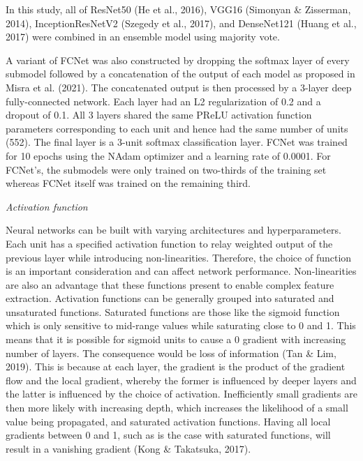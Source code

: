 \documentclass[
]{article}
\begin{document}
In this study, all of ResNet50 (He et al., 2016), VGG16 (Simonyan \&
Zisserman, 2014), InceptionResNetV2 (Szegedy et al., 2017), and
DenseNet121 (Huang et al., 2017) were combined in an ensemble model
using majority vote.

A variant of FCNet was also constructed by dropping the softmax layer of
every submodel followed by a concatenation of the output of each model
as proposed in Misra et al. (2021). The concatenated output is then
processed by a 3-layer deep fully-connected network. Each layer had an
L2 regularization of 0.2 and a dropout of 0.1. All 3 layers shared the
same PReLU activation function parameters corresponding to each unit and
hence had the same number of units (552). The final layer is a 3-unit
softmax classification layer. FCNet was trained for 10 epochs using the
NAdam optimizer and a learning rate of 0.0001. For FCNet's, the
submodels were only trained on two-thirds of the training set whereas
FCNet itself was trained on the remaining third.

\emph{Activation function}

Neural networks can be built with varying architectures and
hyperparameters. Each unit has a specified activation function to relay
weighted output of the previous layer while introducing non-linearities.
Therefore, the choice of function is an important consideration and can
affect network performance. Non-linearities are also an advantage that
these functions present to enable complex feature extraction. Activation
functions can be generally grouped into saturated and unsaturated
functions. Saturated functions are those like the sigmoid function which
is only sensitive to mid-range values while saturating close to 0 and 1.
This means that it is possible for sigmoid units to cause a 0 gradient
with increasing number of layers. The consequence would be loss of
information (Tan \& Lim, 2019). This is because at each layer, the
gradient is the product of the gradient flow and the local gradient,
whereby the former is influenced by deeper layers and the latter is
influenced by the choice of activation. Inefficiently small gradients
are then more likely with increasing depth, which increases the
likelihood of a small value being propagated, and saturated activation
functions. Having all local gradients between 0 and 1, such as is the
case with saturated functions, will result in a vanishing gradient (Kong
\& Takatsuka, 2017).
\end{document}
